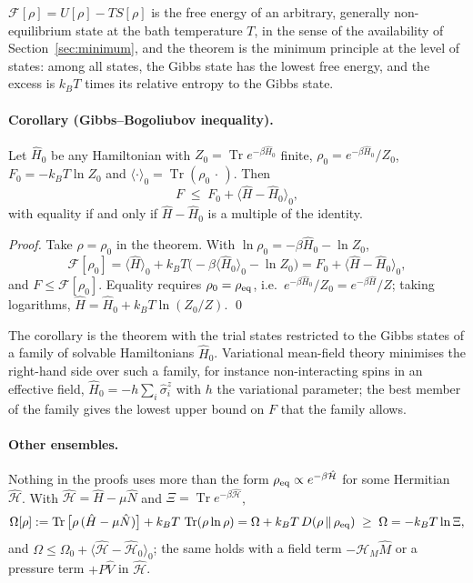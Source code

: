 \documentclass[10pt,a4paper]{article}
\theoremstyle{remark}
\newcommand{\Tr}{\operatorname{Tr}}
\newcommand{\hmag}{\mathcal{H}_M}
\begin{document}
$ \mathcal{F}[\rho] = U[\rho] - TS[\rho] $ is the free energy of an arbitrary,
generally non-equilibrium state at the bath temperature $ T $, in the sense of the
availability of Section~\ref{sec:minimum}, and the theorem is the minimum principle at
the level of states: among all states, the Gibbs state has the lowest free energy, and
the excess is $ k_BT $ times its relative entropy to the Gibbs state.

\paragraph{Corollary (Gibbs--Bogoliubov inequality).} Let $ \hat H_0 $ be any
Hamiltonian with $ Z_0 = \Tr e^{-\beta\hat H_0} $ finite, $ \rho_0 = e^{-\beta\hat H_0}/Z_0 $,
$ F_0 = -k_BT\ln Z_0 $ and $ \langle\cdot\rangle_0 = \Tr(\rho_0\,\cdot\,) $. Then
\[
  F \;\leq\; F_0 + \langle\hat H - \hat H_0\rangle_0 ,
\]
with equality if and only if $ \hat H - \hat H_0 $ is a multiple of the identity.

\emph{Proof.} Take $ \rho = \rho_0 $ in the theorem. With
$ \ln\rho_0 = -\beta\hat H_0 - \ln Z_0 $,
\[
  \mathcal{F}[\rho_0] = \langle\hat H\rangle_0 + k_BT\big(-\beta\langle\hat H_0\rangle_0 - \ln Z_0\big)
  = F_0 + \langle\hat H - \hat H_0\rangle_0 ,
\]
and $ F \leq \mathcal{F}[\rho_0] $. Equality requires $ \rho_0 = \rho_{\rm eq} $, i.e.\
$ e^{-\beta\hat H_0}/Z_0 = e^{-\beta\hat H}/Z $; taking logarithms,
$ \hat H = \hat H_0 + k_BT\ln(Z_0/Z) $. \qed

The corollary is the theorem with the trial states restricted to the Gibbs states of a
family of solvable Hamiltonians $ \hat H_0 $. Variational mean-field theory minimises
the right-hand side over such a family, for instance non-interacting spins in an
effective field, $ \hat H_0 = -h\sum_i\hat\sigma^z_i $ with $ h $ the variational parameter;
the best member of the family gives the lowest upper bound on $ F $ that the family
allows.

\paragraph{Other ensembles.} Nothing in the proofs uses more than the form
$ \rho_{\rm eq} \propto e^{-\beta\hat{\mathcal{H}}} $ for some Hermitian $ \hat{\mathcal{H}} $. With
$ \hat{\mathcal{H}} = \hat H - \mu\hat N $ and $ \Xi = \Tr e^{-\beta\hat{\mathcal{H}}} $,
\[
  \Omega[\rho] := \Tr\big[\rho\,(\hat H - \mu\hat N)\big] + k_BT\,\Tr(\rho\ln\rho)
  = \Omega + k_BT\,D(\rho\,\|\,\rho_{\rm eq}) \;\geq\; \Omega = -k_BT\ln\Xi ,
\]
and $ \Omega \leq \Omega_0 + \langle\hat{\mathcal{H}} - \hat{\mathcal{H}}_0\rangle_0 $; the same holds with a field
term $ -\hmag{}\hat M $ or a pressure term $ +P\hat V $ in $ \hat{\mathcal{H}} $.
\end{document}
